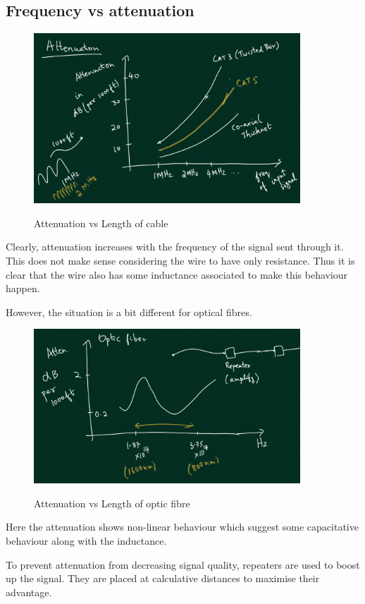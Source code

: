 \documentclass[12pt]{article}
\begin{document}
\subsection{Frequency vs attenuation}
\begin{figure}[H]
    \centering
    \includegraphics[width = 10cm]{Diagrams/attenuation.png}
    \label{fig:attenuation}
    \caption{Attenuation vs Length of cable}
\end{figure}
          
Clearly, attenuation increases with the frequency of the signal sent through it. 
This does not make sense considering the wire to have only resistance. Thus it is clear that the wire also has some inductance associated to make this behaviour happen. 


However, the situation is a bit different for optical fibres. 
\begin{figure}[H]
    \centering
    \includegraphics[width = 10cm]{Diagrams/optic_attenation.png}
    \label{fig:optic-attenuation}
    \caption{Attenuation vs Length of optic fibre}
\end{figure}

Here the attenuation shows non-linear behaviour which suggest some capacitative behaviour along with the inductance.

To prevent attenuation from decreasing signal quality, repeaters are used to boost up the signal. They are placed at calculative 
distances to maximise their advantage. 
\end{document}
